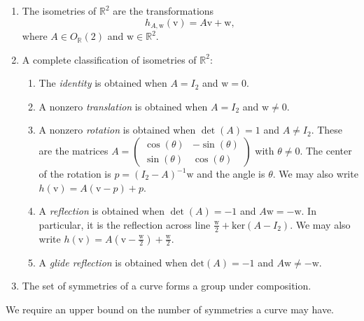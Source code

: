 \documentclass[11pt]{article}
\theoremstyle{definition}
\newcommand{\RR}{\mathbb R}
\newcommand*{\vecw}{\mathrm{w}}
\newcommand*{\vecv}{\mathrm{v}}
\begin{document}
\begin{enumerate}[label=(\textbf{Iso-\arabic*}),ref=(\textbf{Iso-\arabic*})]
    \item \label{isofact:def} The isometries of $\RR^2$ are the transformations 
    \[ h_{A, \vecw}(\vecv) = A\vecv + \vecw,\]
    where $A \in O_\RR(2)$ and $\vecw \in \RR^2$.
    \item \label{isofact:classification} A complete classification of isometries of $\RR^2$:
    \begin{enumerate}
        \item The \emph{identity} is obtained when $A = I_2$ and $\vecw = 0$. 
        \item A nonzero \emph{translation} is obtained when $A = I_2$ and $\vecw \neq 0$. 
        \item A nonzero \emph{rotation} is obtained when $\det(A)=1$ and $A\neq I_2$. These are the matrices $A = \begin{pmatrix}
            \cos(\theta) & -\sin(\theta) \\ \sin(\theta) & \cos(\theta)
        \end{pmatrix}$ with $\theta \neq 0$. The center of the rotation is $p = (I_2 - A)^{-1}\vecw$ and the angle is $\theta$. We may also write $h(\vecv)=A(\vecv - p) + p$.
        \item A \emph{reflection} is obtained when $\det(A)=-1$ and $A\vecw = -\vecw$. In particular, it is the reflection across line $\frac{\vecw}{2} + \mathrm{ker}(A - I_2)$. We may also write $h(\vecv) = A\left(\vecv - \frac{\vecw}{2}\right) + \frac{\vecw}{2}$.
        \item A \emph{glide reflection} is obtained when $\mathrm{det}(A) = -1$ and $A\vecw \neq -\vecw$. 
    \end{enumerate}
    \item \label{isofact:group} The set of symmetries of a curve forms a group under composition.
\end{enumerate}

We require an upper bound on the number of symmetries a curve may have.
\end{document}
